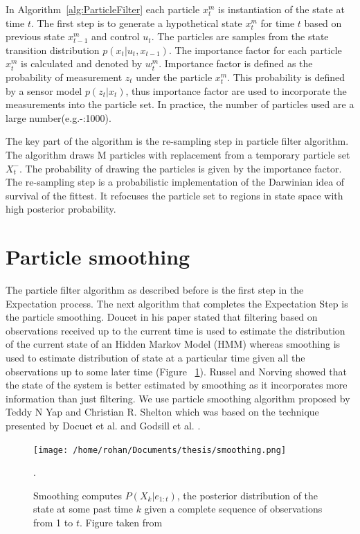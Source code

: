 \documentclass[12pt]{dalcsthesis}
\begin{document}
In Algorithm~\ref{alg:ParticleFilter} each particle $x_{t}^{m}$ is instantiation of the state at time $t$.  The first step is to generate a hypothetical state $x_{t}^{m}$ for time $t$ based on previous state $x_{t-1}^{m}$ and control $u_{t}$. The particles are samples from the state transition distribution $p(x_{t}|u_{t},x_{t-1})$. The importance factor for each particle $x_{t}^{m}$ is calculated and denoted by $w_{t}^{m}$. Importance factor is defined as the probability of measurement $z_{t}$ under the particle $x_{t}^{m}$. This probability is defined by a sensor model $p(z_{t}|x_{t})$, thus importance factor are used to incorporate the measurements into the particle set. In practice, the number of particles used are a large number(e.g.-:1000).

The key part of the algorithm is the re-sampling step in particle filter algorithm. The algorithm draws M particles with replacement from a temporary particle set $X_{t}^{-}$. The probability of drawing the particles is given by the importance factor. The re-sampling step is a probabilistic implementation of the Darwinian idea of survival of the fittest. It refocuses the particle set to regions in state space with high posterior probability. 

\section{Particle smoothing}
\label{ch-: particle smoothing}
The particle filter algorithm as described before is the first step in the Expectation process. The next algorithm that completes the Expectation Step is the particle smoothing. Doucet \cite{doucet2009tutorial} in his paper stated that filtering based on observations received up to the current time is used to estimate the distribution of the current state of an Hidden Markov Model (HMM) whereas smoothing is used to estimate distribution of state at a particular time given all the observations up to some later time (Figure ~\ref{fig: particle smoothing}). Russel and Norving \cite{russell2003artificial} showed that the state of the system is better estimated by smoothing as it incorporates more information than just filtering. We use particle smoothing algorithm proposed by Teddy N Yap and Christian R. Shelton \cite{Yap2008} which was based on the technique presented by Docuet et al. \cite{doucet2000monte} and Godsill et al. \cite{Godsill2004}.
\begin{figure}
\centering
{\texttt{[image: /home/rohan/Documents/thesis/smoothing.png]}}

\caption{\label{fig: particle smoothing} Smoothing computes $P(X_{k}|e_{1:t})$, the posterior distribution of the state at some past time $k$ given a complete sequence of observations from 1 to $t$. Figure taken from \cite{russell2003artificial}}.
\end{figure}
\end{document}
